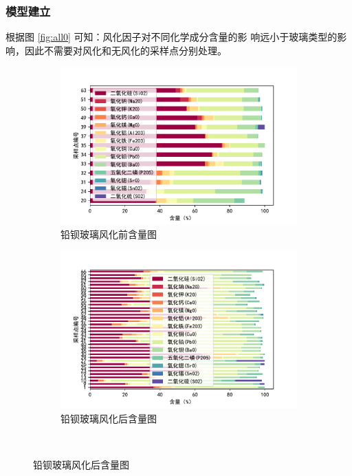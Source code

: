 \documentclass[withoutpreface,bwprint]{cumcmthesis} %
\begin{document}
\subsubsection{模型建立}
根据图 \ref{fig:all0} 可知：风化因子对不同化学成分含量的影
响远小于玻璃类型的影响，因此不需要对风化和无风化的采样点分别处理。
\begin{figure}[!htb]
    \centering
    \begin{subfigure}{0.45\textwidth}
        \centering
        \includegraphics[scale=0.45]{铅钡无风化.pdf}
        \caption{铅钡玻璃风化前含量图}
    \end{subfigure}
    \qquad
    \begin{subfigure}{0.45\textwidth}
        \centering
        \includegraphics[scale=0.45]{铅钡风化.pdf}
        \caption{铅钡玻璃风化后含量图}
    \end{subfigure} \\[10pt]

\end{figure}
\end{document}

